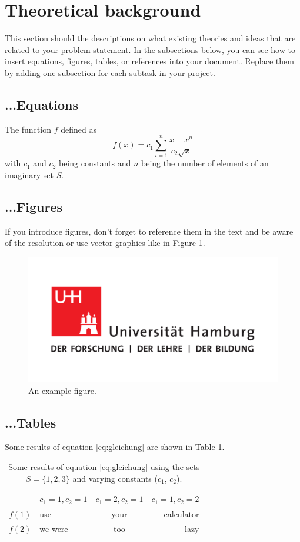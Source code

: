 \documentclass[a4paper,11pt,english]{article}
\begin{document}
\section{Theoretical background}
This section should the descriptions on what existing theories and ideas that are related to your problem statement.
In the subsections below, you can see how to insert equations, figures, tables, or references into your document.
Replace them by adding one subsection for each subtask in your project.

\subsection{...Equations}
The function $f$ defined as
\begin{equation}
f(x) = c_1 \sum_{i=1}^n {\frac{x+x^n}{c_2 \sqrt{x}}}
\label{eq:gleichung}
\end{equation}
\noindent 
with $c_1$ and $c_2$ being constants and $n$ being the number of elements of an imaginary set $S$. 

\subsection{...Figures}
If you introduce figures, don't forget to reference them in the text and be aware of the resolution or use vector graphics like in Figure \ref{fig:logo}.

\begin{figure}
\begin{center}
\includegraphics[width=0.5\linewidth]{uhhlogo.pdf} 
\caption{An example figure.}
\label{fig:logo}
\end{center}
\end{figure}

\subsection{...Tables}
Some results of equation \ref{eq:gleichung} are shown in Table \ref{tab:results}.

\begin{table}[t] 
\begin{center}
\caption{Some results of equation \ref{eq:gleichung} using the sets $S = \{1,2,3\}$ and varying constants ($c_1$, $c_2$).}
\label{tab:results}
\begin{tabular}{|c|l|c|r|} 
\hline
  & $c_1 = 1, c_2 = 1$  & $c_1 = 2, c_2 = 1$  & $c_1 = 1, c_2 = 2$  \\
\hline
$f(1)$  & use  & your  & calculator  \\
$f(2)$  & we were  & too  & lazy  \\
\hline
\end{tabular}
\end{center}
\end{table}
\end{document}
